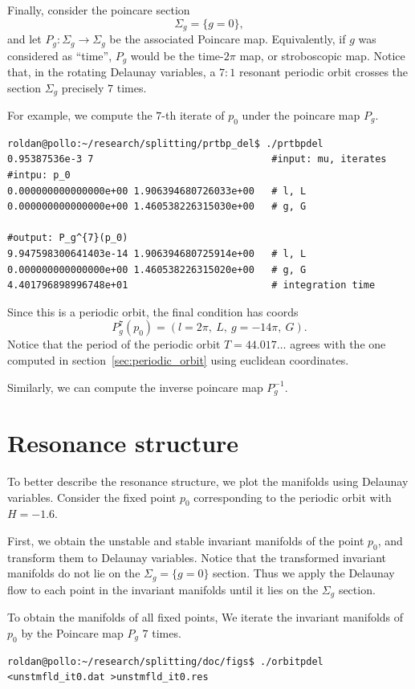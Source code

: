 \documentclass[a4paper]{amsart}
\theoremstyle{remark}
\begin{document}
Finally, consider the poincare section 
\[ \Sigma_g=\{g=0\}, \]
and let $P_g\colon \Sigma_g \to \Sigma_g$ be the associated Poincare
map. 
Equivalently, if $g$ was considered as ``time'', $P_g$ would be the
time-$2\pi$ map, or stroboscopic map.
Notice that, in the rotating Delaunay variables, a $7:1$ resonant
periodic orbit crosses the section $\Sigma_g$ precisely $7$ times.

For example, we compute the $7$-th iterate of $p_0$ under the
poincare map $P_g$. 
\begin{verbatim}
roldan@pollo:~/research/splitting/prtbp_del$ ./prtbpdel
0.95387536e-3 7                               #input: mu, iterates
#intpu: p_0
0.000000000000000e+00 1.906394680726033e+00   # l, L
0.000000000000000e+00 1.460538226315030e+00   # g, G

#output: P_g^{7}(p_0)
9.947598300641403e-14 1.906394680725914e+00   # l, L
0.000000000000000e+00 1.460538226315020e+00   # g, G
4.401796898996748e+01                         # integration time
\end{verbatim}
Since this is a periodic orbit, the final condition has coords 
\[ P_g^{7}(p_0) = (l=2\pi,\ L,\ g=-14\pi,\ G). \]
Notice that the period of the periodic orbit $T=44.017\dots$ agrees
with the one computed in section~\ref{sec:periodic_orbit} using
euclidean coordinates.

Similarly, we can compute the inverse poincare map $P_g^{-1}$.

\section{Resonance structure}\label{sec:resonance_structure}

To better describe the resonance structure, we plot the manifolds
using Delaunay variables. 
Consider the fixed point $p_0$ corresponding to the periodic orbit
with $H=-1.6$.

First, we obtain the unstable and stable invariant manifolds of the
point $p_0$, and transform them to Delaunay variables. 
Notice that the transformed invariant manifolds do not lie on the
$\Sigma_g=\{g=0\}$ section.
Thus we apply the Delaunay flow to each point in the invariant
manifolds until it lies on the $\Sigma_g$ section.

To obtain the manifolds of all fixed points, We iterate the invariant manifolds
of $p_0$ by the Poincare map $P_g$ $7$ times.
\begin{verbatim}
roldan@pollo:~/research/splitting/doc/figs$ ./orbitpdel
<unstmfld_it0.dat >unstmfld_it0.res
\end{verbatim}
\end{document}
